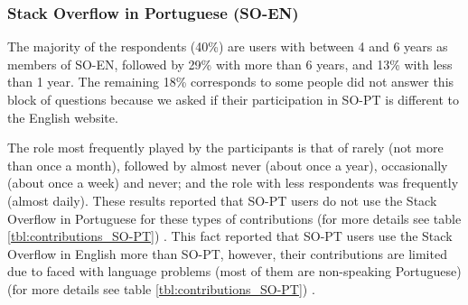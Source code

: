 \subsubsection{Stack Overflow in Portuguese (SO-EN)}
\noindent The majority of the respondents (40\%) are users with between 4 and 6 years as members of SO-EN, followed by 29\% with more than 6 years, and 13\% with less than 1 year. The remaining 18\% corresponds to some people did not answer this block of questions because we asked if their participation in SO-PT is different to the English website.

The role most frequently played by the participants is that of rarely (not more than once a month), followed by almost never (about once a year), occasionally (about once a week) and never; and the role with less respondents was frequently (almost daily). These results reported that SO-PT users do not use the Stack Overflow in Portuguese for these types of contributions (for more details see table \ref{tbl:contributions_SO-PT}) . This fact reported that SO-PT users use the Stack Overflow in English more than SO-PT, however, their contributions are limited due to faced with language problems (most of them are non-speaking Portuguese) (for more details see table \ref{tbl:contributions_SO-PT}) .  

